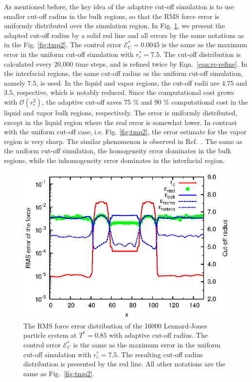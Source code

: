 \documentclass[aps,pre,preprint]{revtex4-1}
\begin{document}
As mentioned before, the key idea of the adaptive cut-off simulation
is to use smaller cut-off
radius in the bulk regions, so that the RMS force error is uniformly
distributed over the simulation region. In Fig. \ref{fig:tmp3}, we
present the adapted cut-off radius by a solid red line and all errors
by the same notations as in the Fig. \ref{fig:tmp2}. The control error
$\mathcal E^\ast_{\textrm{C}} = 0.0045$ is the same as the maximum
error in the uniform cut-off simulation with $r_c^\ast=7.5$. The
cut-off distribution is calculated every 20,000 time steps, and is
refined twice by Eqn.~\eqref{eqn:rc-refine}. In the interfacial
regions, the same cut-off radius as the uniform cut-off simulation,
namely $7.5$, is used.  In the
liquid and vapor regions, the cut-off radii are $4.75$ and $3.5$,
respective, which is notably reduced. Since the computational cost
grows with $\mathcal O(r_c^3)$, the adaptive cut-off saves 75 \% and
90 \% computational cost in the liquid and vapor bulk regions,
respectively.  The error is uniformly distributed, except in the
liquid region where the real error is somewhat lower.
In contrast with the uniform
cut-off case, i.e. Fig. \ref{fig:tmp2}, the error estimate for the
vapor region is very sharp. The similar phenomenon is observed in
Ref.~\cite{wang2011}. The same as the uniform cut-off simulation, the
homogeneity error dominates in the bulk regions, while the
inhomogeneity error dominates in the interfacial region.

\begin{figure}
  \centering
  \includegraphics[]{fig/t0.85-n16000-adapt-e0.0045-extend/rcut.and.error.eps}
  \caption{ The RMS force error distribution of the 16000
    Lennard-Jones particle system at $T^\ast=0.85$ with adaptive
    cut-off radius. The control error $\mathcal E^\ast_{\textrm{C}}$
    is the same as the maximum error in the uniform cut-off simulation
    with $r_c^\ast=7.5$.  The resulting cut-off radius distribution is
    presented by the red line. All other notations are the same as
    Fig.~\ref{fig:tmp2}.}
  \label{fig:tmp3}
\end{figure}
\end{document}
